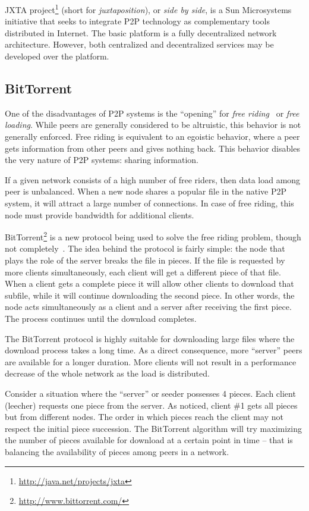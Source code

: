JXTA project\footnote{\url{http://java.net/projects/jxta}} (short for \textit{juxtaposition}), or
\textit{side by side}, is a Sun
Microsystems initiative that seeks to integrate P2P technology as
complementary tools distributed in Internet. The basic platform is a fully
decentralized network architecture. However, both centralized and
decentralized services may be developed over the platform.

\subsection{BitTorrent}

One of the disadvantages of P2P systems is the ``opening'' for \textit{free
riding}~\cite{free-riding} or \textit{free loading}. While peers are generally
considered to be altruistic, this behavior is not generally enforced. Free
riding is equivalent to an egoistic behavior, where a peer gets information
from other peers and gives nothing back. This behavior disables the very
nature of P2P systems: sharing information.

If a given network consists of a high number of free riders, then data load
among peer is unbalanced. When a new node shares a popular file in the native
P2P system, it will attract a large number of connections. In case of free
riding, this node must provide bandwidth for additional clients.

BitTorrent\footnote{\url{http://www.bittorrent.com/}} is a new protocol being used to solve the free riding problem,
though not completely~\cite{free-riding}. The idea behind the protocol is
fairly simple: the node that plays the role of the server breaks the file in
pieces. If the file is requested by more clients simultaneously, each client
will get a different piece of that file. When a client gets a complete piece
it will allow other clients to download that subfile, while it will continue
downloading the second piece. In other words, the node acts simultaneously as
a client and a server after receiving the first piece. The process continues
until the download completes.

The BitTorrent protocol is highly suitable for downloading large files where
the download process takes a long time. As a direct consequence, more
``server'' peers are available for a longer duration. More clients will not
result in a performance decrease of the whole network as the load is
distributed.

Consider a situation where the ``server'' or seeder possesses 4 pieces. Each
client (leecher) requests one piece from the server. As noticed, client \#1
gets all pieces but from different nodes. The order in which pieces reach the
client may not respect the initial piece succession. The BitTorrent algorithm
will try maximizing the number of pieces available for download at a certain
point in time -- that is balancing the availability of pieces among peers in a
network.

